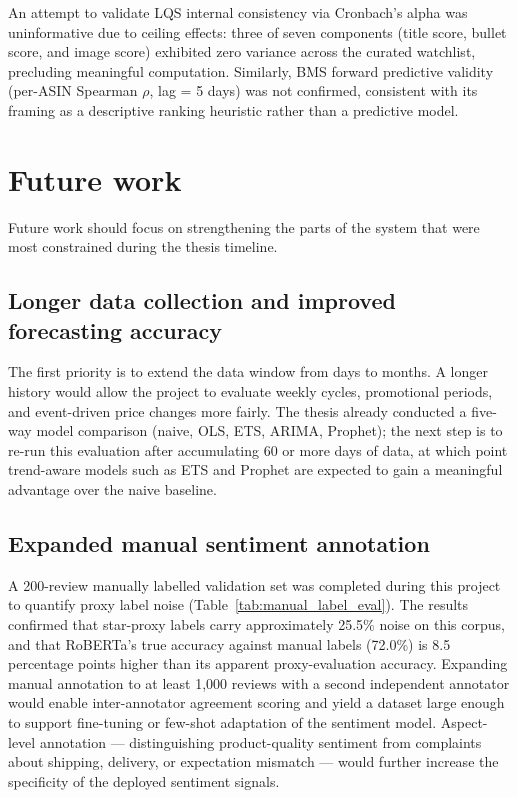 An attempt to validate LQS internal consistency via Cronbach's alpha was uninformative due to ceiling effects: three of seven components (title score, bullet score, and image score) exhibited zero variance across the curated watchlist, precluding meaningful computation. Similarly, BMS forward predictive validity (per-ASIN Spearman $\rho$, lag = 5 days) was not confirmed, consistent with its framing as a descriptive ranking heuristic rather than a predictive model.

\section{Future work}

Future work should focus on strengthening the parts of the system that were most constrained during the thesis timeline.

\subsection{Longer data collection and improved forecasting accuracy}

The first priority is to extend the data window from days to months. A longer history would allow the project to evaluate weekly cycles, promotional periods, and event-driven price changes more fairly. The thesis already conducted a five-way model comparison (naive, OLS, ETS, ARIMA, Prophet); the next step is to re-run this evaluation after accumulating 60 or more days of data, at which point trend-aware models such as ETS and Prophet are expected to gain a meaningful advantage over the naive baseline.

\subsection{Expanded manual sentiment annotation}

A 200-review manually labelled validation set was completed during this project to quantify proxy label noise (Table~\ref{tab:manual_label_eval}). The results confirmed that star-proxy labels carry approximately 25.5\% noise on this corpus, and that RoBERTa's true accuracy against manual labels (72.0\%) is 8.5 percentage points higher than its apparent proxy-evaluation accuracy. Expanding manual annotation to at least 1,000 reviews with a second independent annotator would enable inter-annotator agreement scoring and yield a dataset large enough to support fine-tuning or few-shot adaptation of the sentiment model. Aspect-level annotation --- distinguishing product-quality sentiment from complaints about shipping, delivery, or expectation mismatch --- would further increase the specificity of the deployed sentiment signals.

